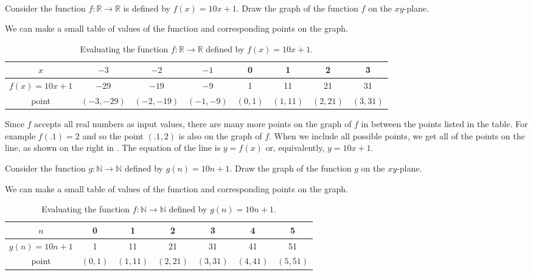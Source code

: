 \begin{exam}
\label{exam_graph_10n+1} 
~
    \begin{apart}
        \item Consider the function $f: \mathbb{R} \to \mathbb{R}$ is defined by $f(x) = 10x + 1$. Draw the graph of the function $f$ on the $xy$-plane.

            \begin{soln}
                We can make a small table of values of the function and corresponding points on the graph.
                
                \begin{table}[htbp]
                    \centering
                    \begin{tabular}{c|c|c|c| c|c|c|c}
                        $x$ & $-3$ & $-2$ & $-1$ & 0 & 1 & 2 & 3 \\ \hline
                        $f(x)=10x+1$  & $-29$ & $-19$ & $-9$ & 1 & 11 & 21 & 31 \\ \hline
                        point & $(-3,-29)$ & $(-2,-19)$ & $(-1,-9)$ & $(0,1)$ & $(1,11)$ & $(2,21)$ & $(3,31)$
                    \end{tabular}
                    \caption{Evaluating the function $f:\mathbb{R} \to\mathbb{R}$ defined by $f(x) = 10x+1$.}
                    \label{table_10xplus1}
                \end{table}

                Since $f$ accepts all real numbers as input values, there are many more points on the graph of $f$ in between the points listed in the table.  For example $f(.1) = 2$ and so the point $(.1,2)$ is also on the graph of $f$.  When we include all possible points, we get all of the points on the line, as shown on the right in . The equation of the line is $y=f(x)$ or, equivalently, $y=10x+1$.                
            \end{soln}
        \item Consider the function $g: \mathbb{N} \to \mathbb{N}$ defined by $g(n) = 10n+1$. Draw the graph of the function $g$ on the $xy$-plane.
            \begin{soln}
                We can make a small table of values of the function and corresponding points on the graph.

                \begin{table}[htbp]
                    \centering
                    \begin{tabular}{c|c|c|c| c|c|c}
                        $n$ & 0 & 1 & 2 & 3 & 4 & 5  \\ \hline
                        $g(n)=10n+1$ & 1 & 11 & 21 & 31 & 41 & 51  \\ \hline
                        point & $(0,1)$ & $(1,11)$ & $(2,21)$ & $(3,31)$ & $(4,41)$ & $(5,51)$
                    \end{tabular}
                    \caption{Evaluating the function $f:\mathbb{N} \to\mathbb{N}$ defined by $g(n) = 10n+1$.}
                    \label{table_10nplus1}
                \end{table}
               

\end{soln}
\end{apart}
\end{exam}
